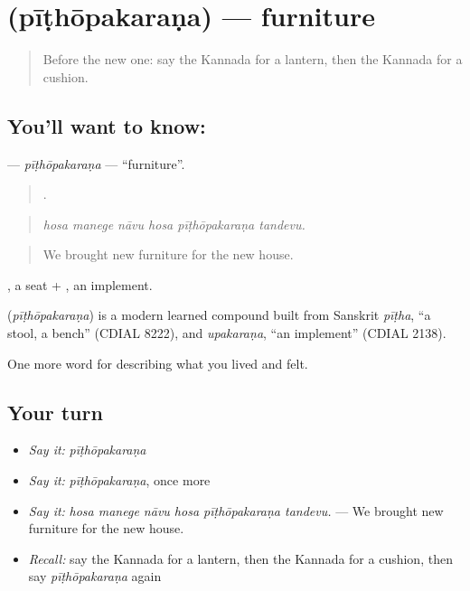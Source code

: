 \section[\texorpdfstring{\kn{ಪೀಠೋಪಕರಣ} (pīṭhōpakaraṇa)}{ಪೀಠೋಪಕರಣ (pīṭhōpakaraṇa)}]{ (pīṭhōpakaraṇa) — furniture}

\label{lesson:KA-C543-pithopakarana}



\begin{quote}
Before the new one: say the Kannada for a lantern, then the Kannada for a cushion.
\end{quote}

\subsection*{You'll want to know: }
\textbf{} — \emph{pīṭhōpakaraṇa} — \textquotedblleft{}furniture\textquotedblright{}.

\begin{quote}
     .
\end{quote}

\begin{quote}
\emph{hosa manege nāvu hosa pīṭhōpakaraṇa tandevu.}
\end{quote}

\begin{quote}
We brought new furniture for the new house.
\end{quote}

, a seat + , an implement.

\begin{cousinweb}
\textbf{} (\emph{pīṭhōpakaraṇa}) is a modern learned compound built from Sanskrit \emph{pīṭha}, \textquotedblleft{}a stool, a bench\textquotedblright{} (CDIAL 8222), and \emph{upakaraṇa}, \textquotedblleft{}an implement\textquotedblright{} (CDIAL 2138).
\end{cousinweb}

\begin{grammarlens}[title={What you've built}]
One more word for describing what you lived and felt.
\end{grammarlens}

\subsection*{Your turn}
\begin{itemize}
\raggedright
  \item \emph{Say it:} \emph{pīṭhōpakaraṇa}
  \item \emph{Say it:} \emph{pīṭhōpakaraṇa}, once more
  \item \emph{Say it:} \emph{hosa manege nāvu hosa pīṭhōpakaraṇa tandevu.} — We brought new furniture for the new house.
  \item \emph{Recall:} say the Kannada for a lantern, then the Kannada for a cushion, then say \emph{pīṭhōpakaraṇa} again
\end{itemize}

